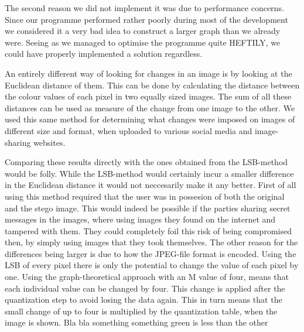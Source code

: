 The second reason we did not implement it was due to performance concerns.
Since our programme performed rather poorly during most of the development we considered it a very bad idea to construct a larger graph than we already were.
Seeing as we managed to optimise the programme quite HEFTILY, we could have properly implemented a solution regardless.



An entirely different way of looking for changes in an image is by looking at the Euclidean distance of them.
This can be done by calculating the distance between the colour values of each pixel in two equally sized images.
The sum of all these distances can be used as measure of the change from one image to the other.
We used this same method for determining what changes were imposed on images of different size and format, when uploaded to various social media and image-sharing websites.

Comparing these results directly with the ones obtained from the LSB-method would be folly.
While the LSB-method would certainly incur a smaller difference in the Euclidean distance it would not neccesarily make it any better.
First of all using this method required that the user was in possesion of both the original and the stego image.
This would indeed be possible if the parties sharing secret messages in the images, where using images they found on the internet and tampered with them.
They could completely foil this risk of being compromised then, by simply using images that they took themselves.
The other reason for the differences being larger is due to how the JPEG-file format is encoded.
Using the LSB of every pixel there is only the potential to change the value of each pixel by one.
Using the graph-theoretical approach with an M value of four, means that each individual value can be changed by four. 
This change is applied after the quantization step to avoid losing the data again.
This in turn means that the small change of up to four is multiplied by the quantization table, when the image is shown.
Bla bla something something green is less than the other